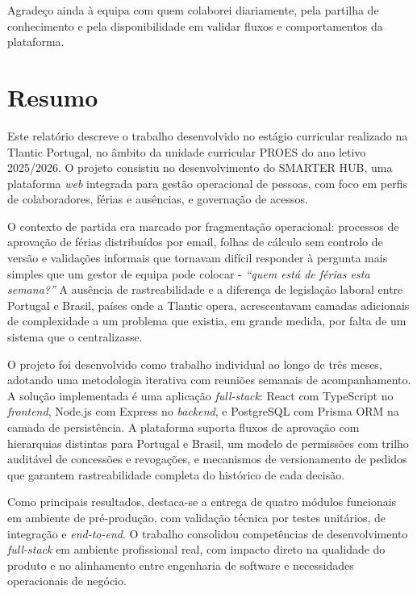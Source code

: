 \documentclass[12pt, a4paper, twoside, openright]{report}
\begin{document}
Agradeço ainda à equipa com quem colaborei diariamente, pela partilha de conhecimento
e pela disponibilidade em validar fluxos e comportamentos da plataforma.

\vspace{1cm}

\chapter*{Resumo}

Este relatório descreve o trabalho desenvolvido no estágio curricular realizado na Tlantic
Portugal, no âmbito da unidade curricular PROES do ano letivo 2025/2026. O projeto
consistiu no desenvolvimento do SMARTER HUB, uma plataforma \textit{web} integrada para
gestão operacional de pessoas, com foco em perfis de colaboradores, férias e ausências,
e governação de acessos.

O contexto de partida era marcado por fragmentação operacional: processos de aprovação
de férias distribuídos por email, folhas de cálculo sem controlo de versão e validações
informais que tornavam difícil responder à pergunta mais simples que um gestor de equipa
pode colocar - \textit{``quem está de férias esta semana?''} A ausência de rastreabilidade
e a diferença de legislação laboral entre Portugal e Brasil, países onde a Tlantic opera,
acrescentavam camadas adicionais de complexidade a um problema que existia, em grande
medida, por falta de um sistema que o centralizasse.

O projeto foi desenvolvido como trabalho individual ao longo de três meses, adotando
uma metodologia iterativa com reuniões semanais de acompanhamento. A solução
implementada é uma aplicação \textit{full-stack}: React com TypeScript no \textit{frontend},
Node.js com Express no \textit{backend}, e PostgreSQL com Prisma ORM na camada de
persistência. A plataforma suporta fluxos de aprovação com hierarquias distintas para
Portugal e Brasil, um modelo de permissões com trilho auditável de concessões e
revogações, e mecanismos de versionamento de pedidos que garantem rastreabilidade
completa do histórico de cada decisão.

Como principais resultados, destaca-se a entrega de quatro módulos funcionais em
ambiente de pré-produção, com validação técnica por testes unitários, de integração e
\textit{end-to-end}. O trabalho consolidou competências de desenvolvimento \textit{full-stack}
em ambiente profissional real, com impacto direto na qualidade do produto e no
alinhamento entre engenharia de software e necessidades operacionais de negócio.
\end{document}
